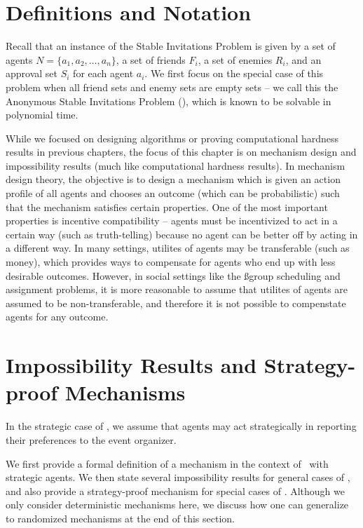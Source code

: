 \section{Definitions and Notation} \label{GT:sec:prelim}

Recall that an instance of the Stable Invitations Problem is given by a set of agents $N = \{a_1, a_2, \dots, a_n\}$, a set of friends $F_i$, a set of enemies $R_i$, and an approval set $S_i$ for each agent $a_i$.
We first focus on the special case of this problem when all friend sets and enemy sets are empty sets -- we call this the Anonymous Stable Invitations Problem (\ASIP), which is known to be solvable in polynomial time. 

While we focused on designing algorithms or proving computational hardness results in previous chapters, the focus of this chapter is on mechanism design and impossibility results (much like computational hardness results). In mechanism design theory, the objective is to design a mechanism which is given an action profile of all agents and chooses an outcome (which can be probabilistic) such that the mechanism satisfies certain properties. One of the most important properties is incentive compatibility -- agents must be incentivized to act in a certain way (such as truth-telling) because no agent can be better off by acting in a different way. In many settings, utilites of agents may be transferable (such as money), which provides ways to compensate for agents who end up with less desirable outcomes. However, in social settings like the ßgroup scheduling and assignment problems, it is more reasonable to assume that utilites of agents are assumed to be non-transferable, and therefore it is not possible to compenstate agents for any outcome. 



\section{Impossibility Results and Strategy-proof Mechanisms} \label{GT:sec:Mechanism}
In the strategic case of \ASIP, we assume that agents may act strategically in reporting their preferences to the event organizer. 

We first provide a formal definition of a mechanism in the context of \ASIP\ with strategic agents. 
We then state several impossibility results for general cases of \ASIP, and also provide a strategy-proof mechanism for special cases of \ASIP.  Although we only consider deterministic mechanisms here, we discuss how one can generalize to randomized mechanisms at the end of this section.

